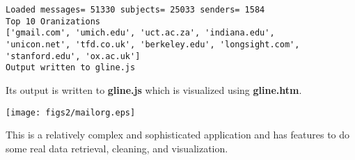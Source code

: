 \beforeverb
\begin{verbatim}
Loaded messages= 51330 subjects= 25033 senders= 1584
Top 10 Oranizations
['gmail.com', 'umich.edu', 'uct.ac.za', 'indiana.edu', 
'unicon.net', 'tfd.co.uk', 'berkeley.edu', 'longsight.com', 
'stanford.edu', 'ox.ac.uk']
Output written to gline.js
\end{verbatim}
\afterverb
%
Its output is written to {\bf gline.js} which is visualized using {\bf gline.htm}.

\beforefig
\centerline{\texttt{[image: figs2/mailorg.eps]}}
\afterfig

This is a relatively complex and sophisticated application and 
has features to do some real data retrieval, cleaning, and visualization.
